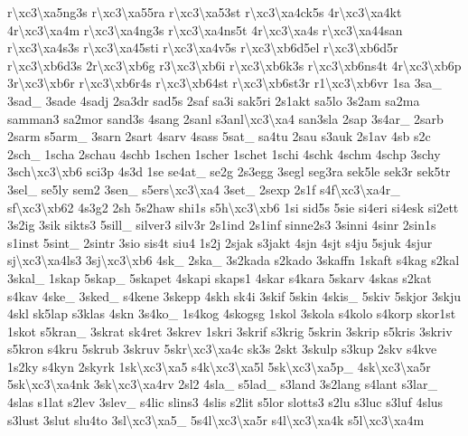 {r\textbackslash{}xc3\textbackslash{}xa5ng3s r\textbackslash{}xc3\textbackslash{}xa55ra r\textbackslash{}xc3\textbackslash{}xa53st r\textbackslash{}xc3\textbackslash{}xa4ck5s 4r\textbackslash{}xc3\textbackslash{}xa4kt 4r\textbackslash{}xc3\textbackslash{}xa4m r\textbackslash{}xc3\textbackslash{}xa4ng3s r\textbackslash{}xc3\textbackslash{}xa4ns5t 4r\textbackslash{}xc3\textbackslash{}xa4s r\textbackslash{}xc3\textbackslash{}xa44san r\textbackslash{}xc3\textbackslash{}xa4s3s r\textbackslash{}xc3\textbackslash{}xa45sti r\textbackslash{}xc3\textbackslash{}xa4v5s r\textbackslash{}xc3\textbackslash{}xb6d5el r\textbackslash{}xc3\textbackslash{}xb6d5r r\textbackslash{}xc3\textbackslash{}xb6d3s 2r\textbackslash{}xc3\textbackslash{}xb6g r3\textbackslash{}xc3\textbackslash{}xb6i r\textbackslash{}xc3\textbackslash{}xb6k3s r\textbackslash{}xc3\textbackslash{}xb6ns4t 4r\textbackslash{}xc3\textbackslash{}xb6p 3r\textbackslash{}xc3\textbackslash{}xb6r r\textbackslash{}xc3\textbackslash{}xb6r4s r\textbackslash{}xc3\textbackslash{}xb64st r\textbackslash{}xc3\textbackslash{}xb6st3r r1\textbackslash{}xc3\textbackslash{}xb6vr 1sa 3sa\-\_\- 3sad\-\_\- 3sade 4sadj 2sa3dr sad5s 2saf sa3i sak5ri 2s1akt sa5lo 3s2am sa2ma samman3 sa2mor sand3s 4sang 2sanl s3anl\textbackslash{}xc3\textbackslash{}xa4 san3sla 2sap 3s4ar\-\_\- 2sarb 2sarm s5arm\-\_\- 3sarn 2sart 4sarv 4sass 5sat\-\_\- sa4tu 2sau s3auk 2s1av 4sb s2c 2sch\-\_\- 1scha 2schau 4schb 1schen 1scher 1schet 1schi 4schk 4schm 4schp 3schy 3sch\textbackslash{}xc3\textbackslash{}xb6 sci3p 4s3d 1se se4at\-\_\- se2g 2s3egg 3segl seg3ra sek5le sek3r sek5tr 3sel\-\_\- se5ly sem2 3sen\-\_\- s5ers\textbackslash{}xc3\textbackslash{}xa4 3set\-\_\- 2sexp 2s1f s4f\textbackslash{}xc3\textbackslash{}xa4r\-\_\- sf\textbackslash{}xc3\textbackslash{}xb62 4s3g2 2sh 5s2haw shi1s s5h\textbackslash{}xc3\textbackslash{}xb6 1si sid5s 5sie si4eri si4esk si2ett 3s2ig 3sik sikts3 5sill\-\_\- silver3 silv3r 2s1ind 2s1inf sinne2s3 3sinni 4sinr 2sin1s s1inst 5sint\-\_\- 2sintr 3sio sis4t siu4 1s2j 2sjak s3jakt 4sjn 4sjt s4ju 5sjuk 4sjur sj\textbackslash{}xc3\textbackslash{}xa4ls3 3sj\textbackslash{}xc3\textbackslash{}xb6 4sk\-\_\- 2ska\-\_\- 3s2kada s2kado 3skaffn 1skaft s4kag s2kal 3skal\-\_\- 1skap 5skap\-\_\- 5skapet 4skapi skaps1 4skar s4kara 5skarv 4skas s2kat s4kav 4ske\-\_\- 3sked\-\_\- s4kene 3skepp 4skh sk4i 3skif 5skin 4skis\-\_\- 5skiv 5skjor 3skju 4skl sk5lap s3klas 4skn 3s4ko\-\_\- 1s4kog 4skogsg 1skol 3skola s4kolo s4korp skor1st 1skot s5kran\-\_\- 3skrat sk4ret 3skrev 1skri 3skrif s3krig 5skrin 3skrip s5kris 3skriv s5kron s4kru 5skrub 3skruv 5skr\textbackslash{}xc3\textbackslash{}xa4c sk3s 2skt 3skulp s3kup 2skv s4kve 1s2ky s4kyn 2skyrk 1sk\textbackslash{}xc3\textbackslash{}xa5 s4k\textbackslash{}xc3\textbackslash{}xa5l 5sk\textbackslash{}xc3\textbackslash{}xa5p\-\_\- 4sk\textbackslash{}xc3\textbackslash{}xa5r 5sk\textbackslash{}xc3\textbackslash{}xa4nk 3sk\textbackslash{}xc3\textbackslash{}xa4rv 2sl2 4sla\-\_\- s5lad\-\_\- s3land 3s2lang s4lant s3lar\-\_\- 4slas s1lat s2lev 3slev\-\_\- s4lic slins3 4slis s2lit s5lor slotts3 s2lu s3luc s3luf 4slus s3lust 3slut slu4to 3sl\textbackslash{}xc3\textbackslash{}xa5\-\_\- 5s4l\textbackslash{}xc3\textbackslash{}xa5r s4l\textbackslash{}xc3\textbackslash{}xa4k s5l\textbackslash{}xc3\textbackslash{}xa4m }
